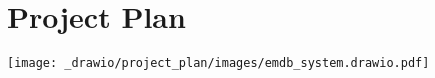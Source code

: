 \chapter{Project Plan}
\begin{center}
    \texttt{[image: \_drawio/project\_plan/images/emdb\_system.drawio.pdf]}
\end{center}
